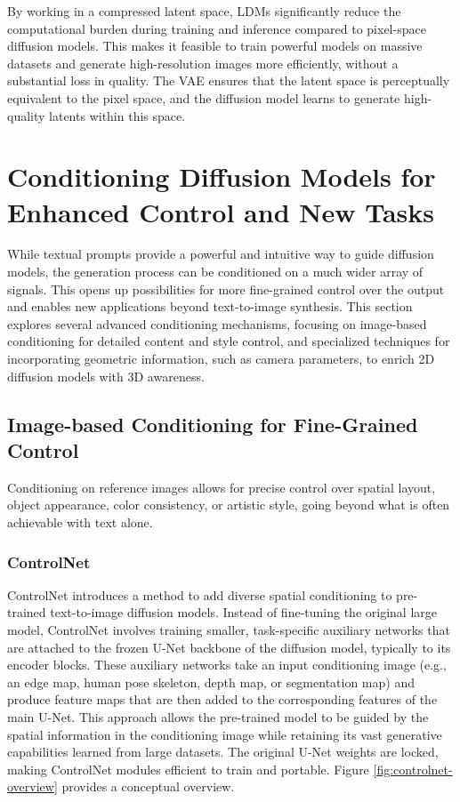 By working in a compressed latent space, LDMs significantly reduce the computational burden during training and inference compared to pixel-space diffusion models. This makes it feasible to train powerful models on massive datasets and generate high-resolution images more efficiently, without a substantial loss in quality. The VAE ensures that the latent space is perceptually equivalent to the pixel space, and the diffusion model learns to generate high-quality latents within this space.

\section{Conditioning Diffusion Models for Enhanced Control and New Tasks}\label{sec:conditioning-diffusion}

While textual prompts provide a powerful and intuitive way to guide diffusion models, the generation process can be conditioned on a much wider array of signals. This opens up possibilities for more fine-grained control over the output and enables new applications beyond text-to-image synthesis. This section explores several advanced conditioning mechanisms, focusing on image-based conditioning for detailed content and style control, and specialized techniques for incorporating geometric information, such as camera parameters, to enrich 2D diffusion models with 3D awareness.

\subsection{Image-based Conditioning for Fine-Grained Control}
Conditioning on reference images allows for precise control over spatial layout, object appearance, color consistency, or artistic style, going beyond what is often achievable with text alone.

\subsubsection{ControlNet}
ControlNet \cite{controlnet} introduces a method to add diverse spatial conditioning to pre-trained text-to-image diffusion models. Instead of fine-tuning the original large model, ControlNet involves training smaller, task-specific auxiliary networks that are attached to the frozen U-Net backbone of the diffusion model, typically to its encoder blocks. These auxiliary networks take an input conditioning image (e.g., an edge map, human pose skeleton, depth map, or segmentation map) and produce feature maps that are then added to the corresponding features of the main U-Net. This approach allows the pre-trained model to be guided by the spatial information in the conditioning image while retaining its vast generative capabilities learned from large datasets. The original U-Net weights are locked, making ControlNet modules efficient to train and portable. Figure \ref{fig:controlnet-overview} provides a conceptual overview.

